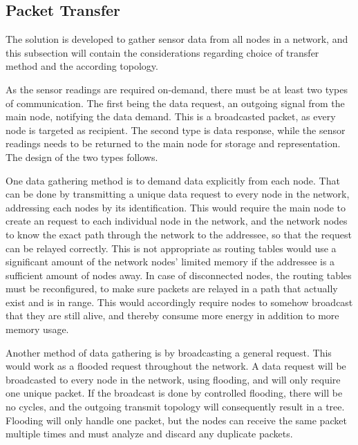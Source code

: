 \subsection{Packet Transfer}
The solution is developed to gather sensor data from all nodes in a network, and this subsection will contain the considerations regarding choice of transfer method and the according topology.


As the sensor readings are required on-demand, there must be at least two types of communication. The first being the data request, an outgoing signal from the main node, notifying the data demand. This is a broadcasted packet, as every node is targeted as recipient. The second type is data response, while the sensor readings needs to be returned to the main node for storage and representation. The design of the two types follows.

One data gathering method is to demand data explicitly from each node. That can be done by transmitting a unique data request to every node in the network, addressing each nodes by its identification. This would require the main node to create an request to each individual node in the network, and the network nodes to know the exact path through the network to the addressee, so that the request can be relayed correctly. This is not appropriate as routing tables would use a significant amount of the network nodes' limited memory if the addressee is a sufficient amount of nodes away. In case of disconnected nodes, the routing tables must be reconfigured, to make sure packets are relayed in a path that actually exist and is in range. This would accordingly require nodes to somehow broadcast that they are still alive, and thereby consume more energy in addition to more memory usage.

Another method of data gathering is by broadcasting a general request. This would work as a flooded request throughout the network.
A data request will be broadcasted to every node in the network, using flooding, and will only require one unique packet.
If the broadcast is done by controlled flooding, there will be no cycles, and the outgoing transmit topology will consequently result in a tree. 
Flooding will only handle one packet, but the nodes can receive the same packet multiple times and must analyze and discard any duplicate packets.

